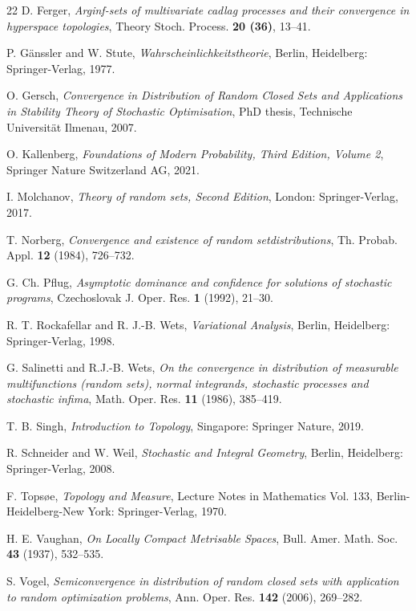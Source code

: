 \documentclass[sn-mathphys,Numbered]{sn-jnl}%
\theoremstyle{thmstyleone}%
\theoremstyle{thmstyletwo}%
\theoremstyle{thmstylethree}%
\begin{document}
\begin{thebibliography}{22}
 D. Ferger, \textit{Arginf-sets of multivariate cadlag processes and their convergence in hyperspace topologies}, Theory Stoch. Process. \textbf{20 (36)}, 13--41.

 P. G\"{a}nssler and W. Stute, \textit{Wahrscheinlichkeitstheorie}, Berlin, Heidelberg: Springer-Verlag, 1977.

 O. Gersch, \textit{Convergence in Distribution of Random Closed Sets and Applications in Stability Theory of Stochastic Optimisation}, PhD thesis, Technische Universit\"{a}t Ilmenau, 2007.

 O. Kallenberg, \textit{Foundations of Modern Probability, Third Edition, Volume 2}, Springer Nature Switzerland AG, 2021.


 I. Molchanov, \textit{Theory of random sets, Second Edition}, London: Springer-Verlag, 2017.

 T. Norberg, \textit{Convergence and existence of random setdistributions}, Th. Probab. Appl. \textbf{12} (1984), 726--732.

 G. Ch. Pflug, \textit{Asymptotic dominance and confidence for solutions of stochastic programs}, Czechoslovak J. Oper. Res. \textbf{1} (1992), 21--30.

 R. T. Rockafellar and R. J.-B. Wets, \textit{Variational Analysis}, Berlin, Heidelberg: Springer-Verlag, 1998.

 G. Salinetti and R.J.-B. Wets, \textit{On the convergence in distribution of measurable multifunctions (random sets), normal integrands, stochastic processes and stochastic infima}, Math. Oper. Res. \textbf{11} (1986), 385--419.

 T. B. Singh, \textit{Introduction to Topology}, Singapore: Springer Nature, 2019.

 R. Schneider and W. Weil, \textit{Stochastic and Integral Geometry}, Berlin, Heidelberg: Springer-Verlag, 2008.

 F. Tops{\o}e, \textit{Topology and Measure}, Lecture Notes in Mathematics Vol. 133, Berlin-Heidelberg-New York: Springer-Verlag, 1970.

 H. E. Vaughan, \textit{On Locally  Compact Metrisable Spaces}, Bull. Amer. Math. Soc. \textbf{43} (1937), 532--535.

 S. Vogel, \textit{Semiconvergence in distribution of random closed sets with application to random optimization problems}, Ann. Oper. Res. \textbf{142} (2006), 269--282.
\end{thebibliography}
\end{document}
